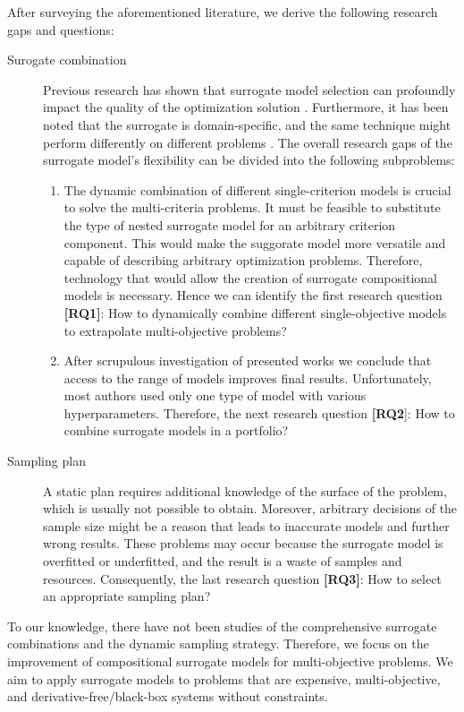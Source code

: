          After surveying the aforementioned literature, we derive the following research gaps and questions:
        \begin{description}
            \item[Surogate combination] Previous research has shown that surrogate model selection can profoundly impact the quality of the optimization solution \cite{HybridSurrRCG}. Furthermore, it has been noted that the surrogate is domain-specific, and the same technique might perform differently on different problems \cite{LuST19}. The overall research gaps of the surrogate model's flexibility can be divided into the following subproblems:
            \begin{enumerate}
                \item The dynamic combination of different single-criterion models is crucial to solve the multi-criteria problems. It must be feasible to substitute the type of nested surrogate model for an arbitrary criterion component. This would make the suggorate model more versatile and capable of describing arbitrary optimization problems. Therefore, technology that would allow the creation of surrogate compositional models is necessary. Hence we can identify the first research question \textbf{[RQ1]}: How to dynamically combine different single-objective models to extrapolate multi-objective problems?
                \item After scrupulous investigation of presented works we conclude that access to the range of models improves final results. Unfortunately, most authors used only one type of model with various hyperparameters. Therefore, the next research question \textbf{[RQ2}]: How to combine surrogate models in a portfolio?
            \end{enumerate}
            \item[Sampling plan] A static plan requires additional knowledge of the surface of the problem, which is usually not possible to obtain. Moreover, arbitrary decisions of the sample size might be a reason that leads to inaccurate models and further wrong results. These problems may occur because the surrogate model is overfitted or underfitted, and the result is a waste of samples and resources. Consequently, the last research question \textbf{[RQ3]}: How to select an appropriate sampling plan?
        \end{description}

        To our knowledge, there have not been studies of the comprehensive surrogate combinations and the dynamic sampling strategy.   Therefore, we focus on the improvement of compositional surrogate models for multi-objective problems. We aim to apply surrogate models to problems that are expensive, multi-objective, and derivative-free/black-box systems without constraints.
